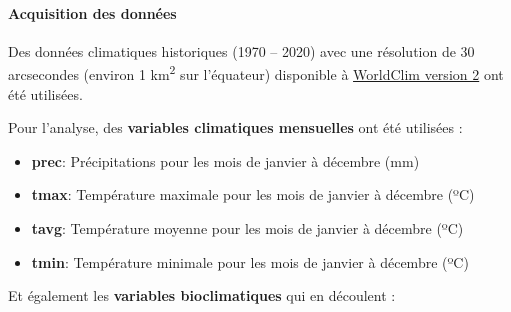 \documentclass[a4paper, notitlepage, 12pt, krantz2]{krantz}
\providecommand{\tightlist}{%
  \setlength{\itemsep}{0pt}\setlength{\parskip}{0pt}}
\let\oldparagraph\paragraph
\renewcommand{\paragraph}[1]{\oldparagraph{#1}\mbox{}}
\begin{document}
\hypertarget{acquisition-des-donnees}{%
\paragraph{Acquisition des données}\label{acquisition-des-donnees}}

Des données climatiques historiques (1970 -- 2020) avec une résolution de 30 arcsecondes (environ 1 km\textsuperscript{2} sur l'équateur) disponible à \href{https://www.worldclim.org/data/worldclim21.html}{WorldClim version 2} ont été utilisées.

Pour l'analyse, des \textbf{variables climatiques mensuelles} ont été utilisées :

\begin{itemize}
\tightlist
\item
  \textbf{prec}: Précipitations pour les mois de janvier à décembre (mm)
\item
  \textbf{tmax}: Température maximale pour les mois de janvier à décembre (ºC)
\item
  \textbf{tavg}: Température moyenne pour les mois de janvier à décembre (ºC)
\item
  \textbf{tmin}: Température minimale pour les mois de janvier à décembre (ºC)
\end{itemize}

Et également les \textbf{variables bioclimatiques} qui en découlent :
\end{document}
